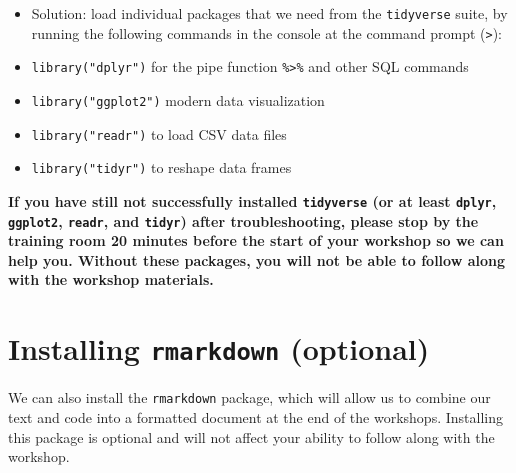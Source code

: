 \documentclass[
]{book}
\providecommand{\tightlist}{%
  \setlength{\itemsep}{0pt}\setlength{\parskip}{0pt}}
\begin{document}
\begin{enumerate}
  \begin{itemize}
  \tightlist
  \item
    Solution: load individual packages that we need from the \texttt{tidyverse} suite, by running the following commands in the console at the command prompt (\texttt{\textgreater{}}):
  \item
    \texttt{library("dplyr")} for the pipe function \texttt{\%\textgreater{}\%} and other SQL commands
  \item
    \texttt{library("ggplot2")} modern data visualization
  \item
    \texttt{library("readr")} to load CSV data files
  \item
    \texttt{library("tidyr")} to reshape data frames
  \end{itemize}
\end{enumerate}

\textbf{If you have still not successfully installed \texttt{tidyverse} (or at least \texttt{dplyr}, \texttt{ggplot2}, \texttt{readr}, and \texttt{tidyr}) after troubleshooting, please stop by the training room 20 minutes before the start of your workshop so we can help you. Without these packages, you will not be able to follow along with the workshop materials.}

\hypertarget{installing-rmarkdown-optional}{%
\section{\texorpdfstring{Installing \texttt{rmarkdown} (optional)}{Installing rmarkdown (optional)}}\label{installing-rmarkdown-optional}}

We can also install the \texttt{rmarkdown} package, which will allow us to
combine our text and code into a formatted document at the end of
the workshops. Installing this package is optional and will not affect
your ability to follow along with the workshop.
\end{document}
